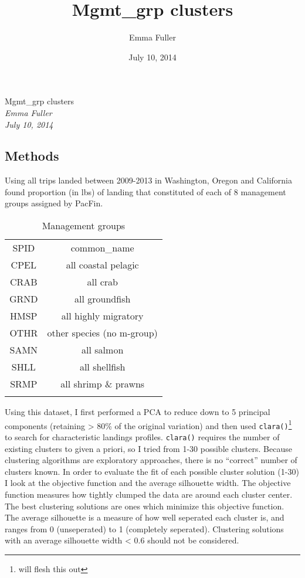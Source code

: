 \documentclass[]{article}
\title{Mgmt\_grp clusters}
\author{Emma Fuller}
\date{July 10, 2014}
\begin{document}
\begin{center}
\huge Mgmt\_grp clusters \\[0.2cm]
\large \emph{Emma Fuller}\\[0.1cm]
\large \emph{July 10, 2014} \\
\normalsize
\end{center}


\subsection{Methods}\label{methods}

Using all trips landed between 2009-2013 in Washington, Oregon and
California found proportion (in lbs) of landing that constituted of each
of 8 management groups assigned by PacFin.

\begin{longtable}[c]{@{}cc@{}}
\toprule\addlinespace
SPID & common\_name
\\\addlinespace
\midrule\endhead
CPEL & all coastal pelagic
\\\addlinespace
CRAB & all crab
\\\addlinespace
GRND & all groundfish
\\\addlinespace
HMSP & all highly migratory
\\\addlinespace
OTHR & other species (no m-group)
\\\addlinespace
SAMN & all salmon
\\\addlinespace
SHLL & all shellfish
\\\addlinespace
SRMP & all shrimp \& prawns
\\\addlinespace
\bottomrule
\addlinespace
\caption{Management groups}
\end{longtable}

Using this dataset, I first performed a PCA to reduce down to 5
principal components (retaining \textgreater{} 80\% of the original
variation) and then used \texttt{clara()}\footnote{will flesh this out}
to search for characteristic landings profiles. \texttt{clara()}
requires the number of existing clusters to given a priori, so I tried
from 1-30 possible clusters. Because clustering algorithms are
exploratory approaches, there is no ``correct'' number of clusters
known. In order to evaluate the fit of each possible cluster solution
(1-30) I look at the objective function and the average silhouette
width. The objective function measures how tightly clumped the data are
around each cluster center. The best clustering solutions are ones which
minimize this objective function. The average silhouette is a measure of
how well seperated each cluster is, and ranges from 0 (unseperated) to 1
(completely seperated). Clustering solutions with an average silhouette
width \textless{} 0.6 should not be considered.
\end{document}
